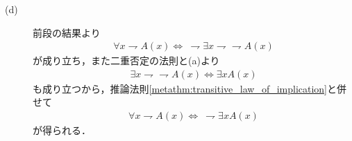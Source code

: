 \begin{prf}
\begin{description}
			\item[(d)]
				前段の結果より
				\begin{align}
					\forall x \rightharpoondown A(x) \Longleftrightarrow\ 
					\rightharpoondown \exists x \rightharpoondown \rightharpoondown A(x)
				\end{align}
				が成り立ち，また二重否定の法則と(a)より
				\begin{align}
					\exists x \rightharpoondown \rightharpoondown A(x)
					\Longleftrightarrow \exists x A(x)
				\end{align}
				も成り立つから，推論法則\ref{metathm:transitive_law_of_implication}と併せて
				\begin{align}
					\forall x \rightharpoondown A(x) \Longleftrightarrow\ 
					\rightharpoondown \exists x A(x)
				\end{align}
				が得られる．
				\QED
		\end{description}
	\end{prf}